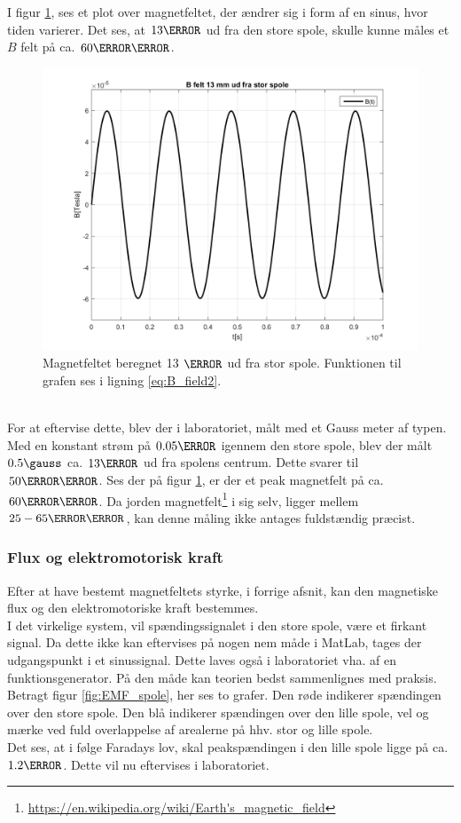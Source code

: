 I figur \ref{fig:B_felt_stor_spole}, ses et plot over magnetfeltet, der ændrer sig i form af en sinus, hvor tiden varierer.
Det ses, at $13\mm$ ud fra den store spole, skulle kunne måles et $B$ felt på ca. $60\micro\tesla$.\\
\begin{figure}[h!]
	\centering
	\includegraphics[width=1\textwidth]{billeder/B_felt_stor_spole.png}
	\caption{Magnetfeltet beregnet 13 $\mm$ ud fra stor spole. Funktionen til grafen ses i ligning \ref{eq:B_field2}.}
	\label{fig:B_felt_stor_spole}
\end{figure}\\
For at eftervise dette, blev der i laboratoriet, målt med et Gauss meter af typen. 
Med en konstant strøm på $0.05\ampere$ igennem den store spole, blev der målt $0.5 \gauss$ ca. $13\mm$ ud fra spolens centrum. 
Dette svarer til $50 \micro\tesla$. 
Ses der på figur \ref{fig:B_felt_stor_spole}, er der et peak magnetfelt på ca. $60\micro\tesla$.
Da jorden magnetfelt\footnote{\url{https://en.wikipedia.org/wiki/Earth's_magnetic_field}} i sig selv, ligger mellem $25-65\micro\tesla$, kan denne måling ikke antages fuldstændig præcist.

\subsubsection{Flux og elektromotorisk kraft}
Efter at have bestemt magnetfeltets styrke, i forrige afsnit, kan den magnetiske flux og den elektromotoriske kraft bestemmes.\\
I det virkelige system, vil spændingssignalet i den store spole, være et firkant signal.
Da dette ikke kan eftervises på nogen nem måde i MatLab, tages der udgangspunkt i et sinussignal.
Dette laves også i laboratoriet vha. af en funktionsgenerator.
På den måde kan teorien bedst sammenlignes med praksis.\\
Betragt figur \ref{fig:EMF_spole}, her ses to grafer.
Den røde indikerer spændingen over den store spole.
Den blå indikerer spændingen over den lille spole, vel og mærke ved fuld overlappelse af arealerne på hhv. stor og lille spole.\\
Det ses, at i følge Faradays lov, skal peakspændingen i den lille spole ligge på ca. $1.2\volt$.
Dette vil nu eftervises i laboratoriet.

